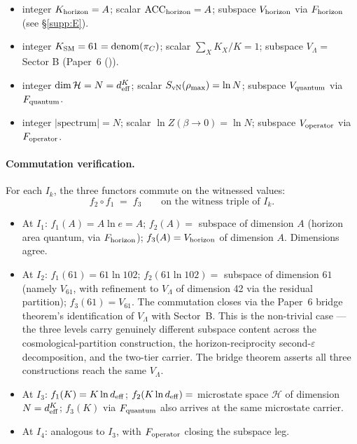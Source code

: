\documentclass[11pt]{article}
\theoremstyle{plain}
\theoremstyle{definition}
\theoremstyle{remark}
\newcommand{\paperref}[2]{Paper~#1 (\emph{#2})}
\begin{document}
\begin{itemize}[leftmargin=2em,itemsep=4pt]
  \item[$I_1$:] integer $K_{\rm horizon} = A$; scalar $\mathrm{ACC}_{\rm horizon} = A$; subspace $V_{\rm horizon}$ via $F_{\rm horizon}$ (see \S\ref{supp:E}).
  \item[$I_2$:] integer $K_{\rm SM} = 61 = \mathrm{denom}(\pi_C)$; scalar $\sum_X K_X/K = 1$; subspace $V_\Lambda = $ Sector B (\paperref{6}{}).
  \item[$I_3$:] integer $\dim \mathcal{H} = N = d_{\rm eff}^K$; scalar $S_{\rm vN}(\rho_{\rm max}) = \ln N$; subspace $V_{\rm quantum}$ via $F_{\rm quantum}$.
  \item[$I_4$:] integer $|\text{spectrum}| = N$; scalar $\ln Z(\beta \to 0) = \ln N$; subspace $V_{\rm operator}$ via $F_{\rm operator}$.
\end{itemize}

\paragraph{Commutation verification.}  For each $I_k$, the three functors commute on the witnessed values:
\[
  f_2 \circ f_1 \;=\; f_3
  \qquad
  \text{on the witness triple of } I_k.
\]

\begin{itemize}[leftmargin=2em,itemsep=3pt]
  \item At $I_1$: $f_1(A) = A \ln e = A$; $f_2(A) = $ subspace of dimension $A$ (horizon area quantum, via $F_{\rm horizon}$); $f_3(A) = V_{\rm horizon}$ of dimension $A$.  Dimensions agree.
  \item At $I_2$: $f_1(61) = 61 \ln 102$; $f_2(61 \ln 102) = $ subspace of dimension $61$ (namely $V_{61}$, with refinement to $V_\Lambda$ of dimension 42 via the residual partition); $f_3(61) = V_{61}$.  The commutation closes via the Paper~6 bridge theorem's identification of $V_\Lambda$ with Sector~B.  This is the non-trivial case --- the three levels carry genuinely different subspace content across the cosmological-partition construction, the horizon-reciprocity second-$\varepsilon$ decomposition, and the two-tier carrier.  The bridge theorem asserts all three constructions reach the same $V_\Lambda$.
  \item At $I_3$: $f_1(K) = K \ln d_{\rm eff}$; $f_2(K \ln d_{\rm eff}) = $ microstate space $\mathcal{H}$ of dimension $N = d_{\rm eff}^K$; $f_3(K) $ via $F_{\rm quantum}$ also arrives at the same microstate carrier.
  \item At $I_4$: analogous to $I_3$, with $F_{\rm operator}$ closing the subspace leg.
\end{itemize}
\end{document}
